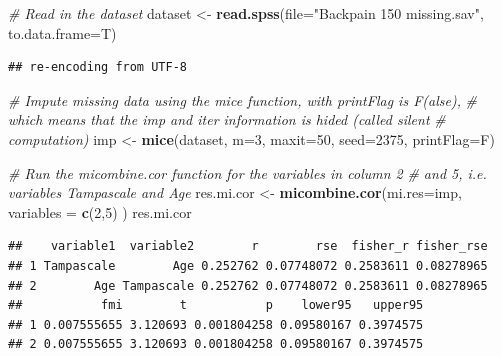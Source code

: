 \documentclass[]{book}
\newenvironment{Shaded}{\begin{snugshade}}{\end{snugshade}}
\newcommand{\KeywordTok}[1]{\textcolor[rgb]{0.13,0.29,0.53}{\textbf{#1}}}
\newcommand{\DataTypeTok}[1]{\textcolor[rgb]{0.13,0.29,0.53}{#1}}
\newcommand{\DecValTok}[1]{\textcolor[rgb]{0.00,0.00,0.81}{#1}}
\newcommand{\StringTok}[1]{\textcolor[rgb]{0.31,0.60,0.02}{#1}}
\newcommand{\CommentTok}[1]{\textcolor[rgb]{0.56,0.35,0.01}{\textit{#1}}}
\newcommand{\NormalTok}[1]{#1}
\begin{document}
\begin{Shaded}
\begin{Highlighting}[]
\CommentTok{# Read in the dataset }
\NormalTok{dataset <-}\StringTok{ }\KeywordTok{read.spss}\NormalTok{(}\DataTypeTok{file=}\StringTok{"Backpain 150 missing.sav"}\NormalTok{, }\DataTypeTok{to.data.frame=}\NormalTok{T)}
\end{Highlighting}
\end{Shaded}

\begin{verbatim}
## re-encoding from UTF-8
\end{verbatim}

\begin{Shaded}
\begin{Highlighting}[]
\CommentTok{# Impute missing data using the mice function, with printFlag is F(alse), }
\CommentTok{# which means that the imp and iter information is hided (called silent }
\CommentTok{# computation)}
\NormalTok{imp <-}\StringTok{ }\KeywordTok{mice}\NormalTok{(dataset, }\DataTypeTok{m=}\DecValTok{3}\NormalTok{, }\DataTypeTok{maxit=}\DecValTok{50}\NormalTok{, }\DataTypeTok{seed=}\DecValTok{2375}\NormalTok{, }\DataTypeTok{printFlag=}\NormalTok{F)}

\CommentTok{# Run the micombine.cor function for the variables in column 2 }
\CommentTok{# and 5, i.e. variables Tampascale and Age}
\NormalTok{res.mi.cor <-}\StringTok{ }\KeywordTok{micombine.cor}\NormalTok{(}\DataTypeTok{mi.res=}\NormalTok{imp, }\DataTypeTok{variables =} \KeywordTok{c}\NormalTok{(}\DecValTok{2}\NormalTok{,}\DecValTok{5}\NormalTok{) )}
\NormalTok{res.mi.cor}
\end{Highlighting}
\end{Shaded}

\begin{verbatim}
##    variable1  variable2        r        rse  fisher_r fisher_rse
## 1 Tampascale        Age 0.252762 0.07748072 0.2583611 0.08278965
## 2        Age Tampascale 0.252762 0.07748072 0.2583611 0.08278965
##           fmi        t           p    lower95   upper95
## 1 0.007555655 3.120693 0.001804258 0.09580167 0.3974575
## 2 0.007555655 3.120693 0.001804258 0.09580167 0.3974575
\end{verbatim}

\begin{Shaded}
\end{Shaded}
\end{document}
